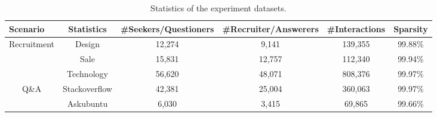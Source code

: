 \begin{table}[]
\caption{Statistics of the experiment datasets.}
\label{tab:data_statistics}
\begin{tabular}{@{}cccccc@{}}
\toprule
\multicolumn{1}{l}{Scenario} & Statistics & \#Seekers/Questioners & \#Recruiter/Answerers  & \#Interactions & Sparsity \\ \midrule
\multirow{3}{*}{Recruitment} & Design & 12,274 & 9,141  & 139,355        & 99.88\%  \\
                             & Sale & 15,831 & 12,757 & 112,340        & 99.94\%  \\
                             & Technology & 56,620 & 48,071 & 808,376 & 99.97\%  \\ \midrule
\multirow{2}{*}{Q\&A}        & Stackoverflow & 42,381 & 25,004  & 360,063                                     & 99.97\%  \\
                             & Askubuntu & 6,030 & 3,415 & 69,865        & 99.66\% \\ \bottomrule
\end{tabular}
\end{table}